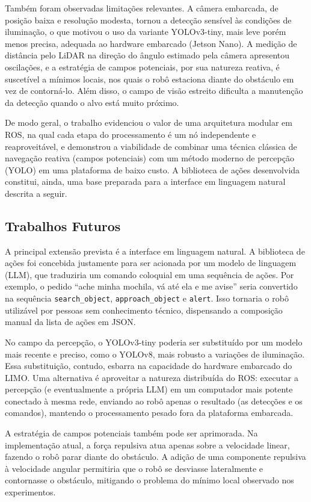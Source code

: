 Também foram observadas limitações relevantes. A câmera embarcada, de posição baixa
e resolução modesta, tornou a detecção sensível às condições de iluminação, o que
motivou o uso da variante YOLOv3-tiny, mais leve porém menos precisa, adequada ao
hardware embarcado (Jetson Nano). A medição de distância pelo LiDAR na direção do
ângulo estimado pela câmera apresentou oscilações, e a estratégia de campos
potenciais, por sua natureza reativa, é suscetível a mínimos locais, nos quais o
robô estaciona diante do obstáculo em vez de contorná-lo. Além disso, o campo de
visão estreito dificulta a manutenção da detecção quando o alvo está muito próximo.

De modo geral, o trabalho evidenciou o valor de uma arquitetura modular em ROS, na
qual cada etapa do processamento é um nó independente e reaproveitável, e demonstrou
a viabilidade de combinar uma técnica clássica de navegação reativa (campos
potenciais) com um método moderno de percepção (YOLO) em uma plataforma de baixo
custo. A biblioteca de ações desenvolvida constitui, ainda, uma base preparada para
a interface em linguagem natural descrita a seguir.

\subsection{Trabalhos Futuros}

A principal extensão prevista é a interface em linguagem natural. A biblioteca de
ações foi concebida justamente para ser acionada por um modelo de linguagem (LLM),
que traduziria um comando coloquial em uma sequência de ações. Por exemplo, o
pedido ``ache minha mochila, vá até ela e me avise'' seria convertido na
sequência \texttt{search\_object}, \texttt{approach\_object} e \texttt{alert}. Isso
tornaria o robô utilizável por pessoas sem conhecimento técnico, dispensando a
composição manual da lista de ações em JSON.

No campo da percepção, o YOLOv3-tiny poderia ser substituído por um modelo mais
recente e preciso, como o YOLOv8, mais robusto a variações de iluminação. Essa
substituição, contudo, esbarra na capacidade do hardware embarcado do LIMO. Uma
alternativa é aproveitar a natureza distribuída do ROS: executar a percepção (e
eventualmente a própria LLM) em um computador mais potente conectado à mesma rede,
enviando ao robô apenas o resultado (as detecções e os comandos), mantendo o
processamento pesado fora da plataforma embarcada.

A estratégia de campos potenciais também pode ser aprimorada. Na implementação
atual, a força repulsiva atua apenas sobre a velocidade linear, fazendo o robô
parar diante do obstáculo. A adição de uma componente repulsiva à velocidade
angular permitiria que o robô se desviasse lateralmente e contornasse o obstáculo,
mitigando o problema do mínimo local observado nos experimentos.

